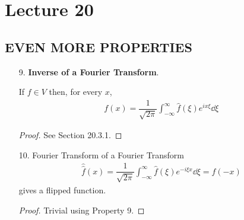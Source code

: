 \section{Lecture 20}
\subsection{EVEN MORE PROPERTIES}
\begin{enumerate}
    \item[9.] \textbf{Inverse of a Fourier Transform}.
    \begin{definition}
        If $f \in V$ then, for every $x$,
        \begin{align}
            \boxed{f(x) = \dfrac{1}{\sqrt{2\pi}} \int_{-\infty}^\infty \hat{f}(\xi) e^{ix\xi} \dd{\xi}}
        \end{align}
    \end{definition}
    \begin{proof}
        See Section 20.3.1.
    \end{proof}
    \item[10.] Fourier Transform of a Fourier Transform
    \begin{align}
        \hat{\hat{f}}(x) = \dfrac{1}{\sqrt{2\pi}} \int_{-\infty}^\infty \hat{f}(\xi) e^{-i\xi x} \dd{\xi} = f(-x)
    \end{align}
    gives a flipped function.
    \begin{proof}
        Trivial using Property 9.
    \end{proof}
\end{enumerate}


